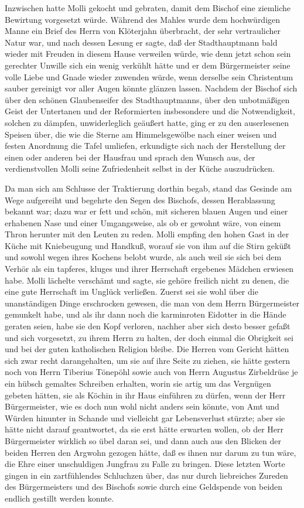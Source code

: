 Inzwischen hatte Molli gekocht und gebraten, damit dem Bischof eine
ziemliche Bewirtung vorgesetzt würde. Während des Mahles wurde dem
hochwürdigen Manne ein Brief des Herrn von Klöterjahn überbracht,
der sehr vertraulicher Natur war, und nach dessen Lesung er sagte,
daß der Stadthauptmann bald wieder mit Freuden in diesem Hause
verweilen würde, wie denn jetzt schon sein gerechter Unwille sich
ein wenig verkühlt hätte und er dem Bürgermeister seine volle Liebe
und Gnade wieder zuwenden würde, wenn derselbe sein Christentum
sauber gereinigt vor aller Augen könnte glänzen lassen. Nachdem der
Bischof sich über den schönen Glaubenseifer des Stadthauptmanns,
über den unbotmäßigen Geist der Untertanen und der Reformierten
insbesondere und die Notwendigkeit, solchen zu dämpfen,
unwiderleglich geäußert hatte, ging er zu den auserlesenen Speisen
über, die wie die Sterne am Himmelsgewölbe nach einer weisen und
festen Anordnung die Tafel umliefen, erkundigte sich nach der
Herstellung der einen oder anderen bei der Hausfrau \pagenum{[42]}
und sprach den Wunsch aus, der verdienstvollen Molli seine
Zufriedenheit selbst in der Küche auszudrücken.

Da man sich am Schlusse der Traktierung dorthin begab, stand das
Gesinde am Wege aufgereiht und begehrte den Segen des Bischofs,
dessen Herablassung bekannt war; dazu war er fett und schön, mit
sicheren blauen Augen und einer erhabenen Nase und einer
Umgangsweise, als ob er gewohnt wäre, von einem Thron herunter mit
den Leuten zu reden. Molli empfing den hohen Gast in der Küche mit
Kniebeugung und Handkuß, worauf sie von ihm auf die Stirn geküßt
und sowohl wegen ihres Kochens belobt wurde, als auch weil sie sich
bei dem Verhör als ein tapferes, kluges und ihrer Herrschaft
ergebenes Mädchen erwiesen habe. Molli lächelte verschämt und
sagte, sie gehöre freilich nicht zu denen, die eine gute Herrschaft
im Unglück verließen. Zuerst sei sie wohl über die unanständigen
Dinge erschrocken gewesen, die man von dem Herrn Bürgermeister
gemunkelt habe, und als ihr dann noch die karminroten Eidotter in
die Hände geraten seien, habe sie den Kopf verloren, nachher aber
sich desto besser gefaßt und sich vorgesetzt, zu ihrem Herrn zu
halten, der doch einmal die Obrigkeit sei und bei der guten
katholischen Religion bleibe. Die Herren vom Gericht hätten sich
zwar recht darangehalten, um sie auf ihre Seite zu ziehen, sie
hätte gestern noch von Herrn Tiberius Tönepöhl sowie auch von Herrn
Augustus Zirbeldrüse je ein hübsch gemaltes Schreiben erhalten,
worin sie artig um das Vergnügen gebeten hätten, sie als Köchin in
ihr Haus einführen zu dürfen, wenn der Herr Bürgermeister, wie es
doch nun wohl nicht anders sein könnte, von Amt und Würden hinunter
in Schande und vielleicht gar Lebensverlust stürzte; aber sie hätte
nicht darauf geantwortet, da sie erst hätte erwarten \pagenum{[43]}
wollen, ob der Herr Bürgermeister wirklich so übel daran sei, und
dann auch aus den Blicken der beiden Herren den Argwohn gezogen
hätte, daß es ihnen nur darum zu tun wäre, die Ehre einer
unschuldigen Jungfrau zu Falle zu bringen. Diese letzten Worte
gingen in ein zartfühlendes Schluchzen über, das nur durch
liebreiches Zureden des Bürgermeisters und des Bischofs sowie durch
eine Geldspende von beiden endlich gestillt werden konnte.

